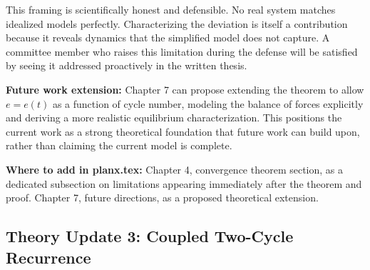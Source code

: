 \documentclass[11pt,a4paper]{article}
\begin{document}
{This framing is scientifically honest and defensible. No real system matches idealized models perfectly. Characterizing the deviation is itself a contribution because it reveals dynamics that the simplified model does not capture. A committee member who raises this limitation during the defense will be satisfied by seeing it addressed proactively in the written thesis.

\textbf{Future work extension:} Chapter 7 can propose extending the theorem to allow $e = e(t)$ as a function of cycle number, modeling the balance of forces explicitly and deriving a more realistic equilibrium characterization. This positions the current work as a strong theoretical foundation that future work can build upon, rather than claiming the current model is complete.

\textbf{Where to add in planx.tex:} Chapter 4, convergence theorem section, as a dedicated subsection on limitations appearing immediately after the theorem and proof. Chapter 7, future directions, as a proposed theoretical extension.
}

\subsection{Theory Update 3: Coupled Two-Cycle Recurrence}
\end{document}
